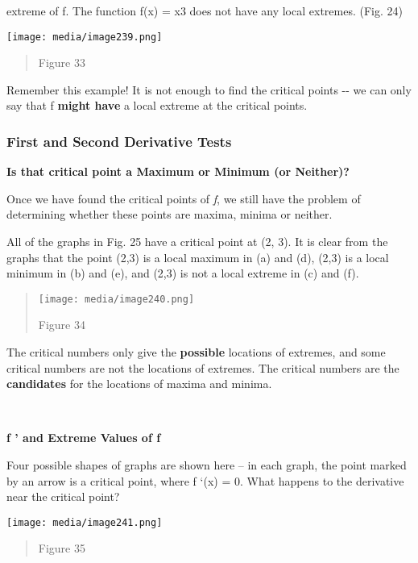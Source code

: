 extreme of f. The function f(x) = x3 does not have any local extremes.
(Fig. 24)

\texttt{[image: media/image239.png]}

\begin{quote}
Figure 33
\end{quote}

Remember this example! It is not enough to find the critical points -\/-
we can only say that f \textbf{might have} a local extreme at the
critical points.

\subsubsection{First and Second Derivative
Tests}\label{first-and-second-derivative-tests}

\textbf{Is that critical point a Maximum or Minimum (or Neither)?}

Once we have found the critical points of \emph{f}, we still have the
problem of determining whether these points are maxima, minima or
neither.

All of the graphs in Fig. 25 have a critical point at (2, 3). It is
clear from the graphs that the point (2,3) is a local maximum in (a) and
(d), (2,3) is a local minimum in (b) and (e), and (2,3) is not a local
extreme in (c) and (f).

\begin{quote}
\texttt{[image: media/image240.png]}

Figure 34
\end{quote}

The critical numbers only give the \textbf{possible} locations of
extremes, and some critical numbers are not the locations of extremes.
The critical numbers are the \textbf{candidates} for the locations of
maxima and minima.

\textbf{\\
}

\textbf{f ' and Extreme Values of f}

Four possible shapes of graphs are shown here -- in each graph, the
point marked by an arrow is a critical point, where f `(x) = 0. What
happens to the derivative near the critical point?

\texttt{[image: media/image241.png]}

\begin{quote}
Figure 35
\end{quote}

